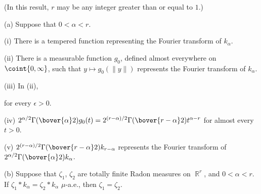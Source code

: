  (In this result,
$r$ may be any integer greater than or equal to $1$.)

(a) Suppose that $0<\alpha<r$.

\quad(i) There is a tempered function representing the
Fourier transform of $k_{\alpha}$.

\quad(ii) There is a measurable function $g_0$, defined almost everywhere
on $\coint{0,\infty}$, such that $y\mapsto g_0(\|y\|)$ represents the
Fourier transform of $k_{\alpha}$.

\quad(iii) In (ii),


\noindent for every $\epsilon>0$.

\quad(iv) $2^{\alpha/2}\Gamma(\bover{\alpha}2)g_0(t)
=2^{(r-\alpha)/2}\Gamma(\bover{r-\alpha}2)t^{\alpha-r}$ for
almost every $t>0$.

\quad(v) $2^{(r-\alpha)/2}\Gamma(\bover{r-\alpha}2)k_{r-\alpha}$
represents the Fourier transform
of $2^{\alpha/2}\Gamma(\bover{\alpha}2)k_{\alpha}$.

(b) Suppose that
$\zeta_1$, $\zeta_2$ are totally finite Radon measures on $\BbbR^r$, and
$0<\alpha<r$.   If $\zeta_1*k_{\alpha}=\zeta_2*k_{\alpha}\,\,\mu$-a.e.,
then $\zeta_1=\zeta_2$.

